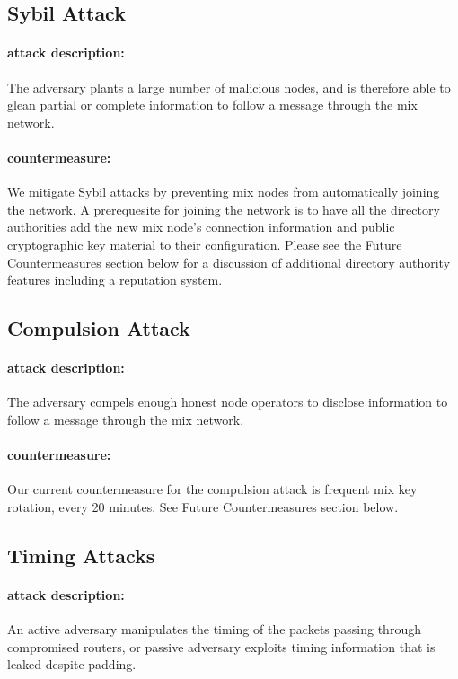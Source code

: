 \documentclass{article}
\begin{document}
\subsection{Sybil Attack}

\paragraph{attack description:} The adversary plants a large number of
malicious nodes, and is therefore able to glean partial or complete information to
follow a message through the mix network.

\paragraph{countermeasure:} We mitigate Sybil attacks by preventing mix nodes from automatically
joining the network. A prerequesite for joining the network is to have all the directory
authorities add the new mix node's connection information and public cryptographic key material to their configuration. Please see the Future Countermeasures section below for a discussion
of additional directory authority features including a reputation system.

\pagebreak

\subsection{Compulsion Attack}

\paragraph{attack description:} The adversary compels enough honest node
operators to disclose information to follow a message through the mix network.

\paragraph{countermeasure:} Our current countermeasure for the compulsion attack is
frequent mix key rotation, every 20 minutes. See Future Countermeasures section below.

\subsection{Timing Attacks}

\paragraph{attack description:} An active adversary manipulates the
timing of the packets passing through compromised routers, or passive adversary
exploits timing information that is leaked despite padding.
\end{document}
